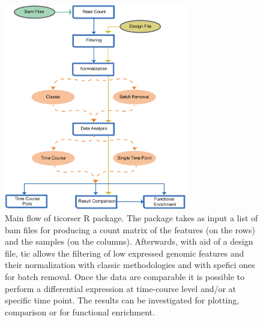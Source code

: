\begin{figure}[H]
\centering
\includegraphics[width=8cm, keepaspectratio]{img/ticorser/main_flow.pdf}
\caption[ticorser mainflow]{Main flow of ticorser R package.
The package takes as input a list of bam files for producing a count matrix of the features (on the rows) and the samples (on the columns).
Afterwards, with aid of a design file, \gls{tic} allows the filtering of low expressed genomic features and their normalization with classic methodologies and with spefici ones for batch removal.
Once the data are comparable it is possible to perform a differential expression at time-course level and/or at specific time point.
The results can be investigated for plotting, comparison or for functional enrichment.}
\label{fig:ticorserflow}
\end{figure}